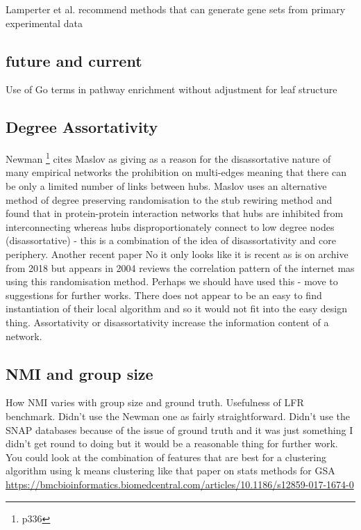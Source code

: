  Lamperter et al. \cite{lamparter2016fast} recommend methods that can generate gene sets from primary experimental data \cite{lamparter2016fast}
 
 
 \subsection{future and current}
 Use of Go terms in pathway enrichment without adjustment for leaf structure
 
 \subsection{Degree Assortativity}
 
Newman \cite{newman2018networks}\footnote{p336} cites Maslov \cite{maslov2004detection} as giving as a reason for the disassortative nature of many empirical networks the prohibition on multi-edges meaning that there can be only a limited number of links between hubs. Maslov uses an alternative method of degree preserving randomisation to the stub rewiring method \cite{maslov2002specificity} and found that in protein-protein interaction networks that hubs are inhibited from interconnecting whereas hubs disproportionately connect to low degree nodes (disassortative) - this is a combination of the idea of disassortativity and core periphery. Another recent paper No it only looks like it is recent as is on archive from 2018 but appears in 2004 reviews the correlation pattern of the internet \cite{maslov2004detection} mas using this randomisation method. Perhaps we should have used this - move to suggestions for further works. There does not appear to be an easy to find instantiation of their local algorithm and so it would not fit into the easy design thing. 
Assortativity or disassortativity increase the information content of a network. 


 \subsection{NMI and group size}
 How NMI varies with group size and ground truth. Usefulness of LFR benchmark. Didn't use the Newman one as fairly straightforward. Didn't use the SNAP databases because of the issue of ground truth and it was just something I didn't get round to doing but it would be a reasonable thing for further work. 
 You could look at the combination of features that are best for a clustering algorithm using k means clustering like that paper on stats methods for GSA \url{https://bmcbioinformatics.biomedcentral.com/articles/10.1186/s12859-017-1674-0}
